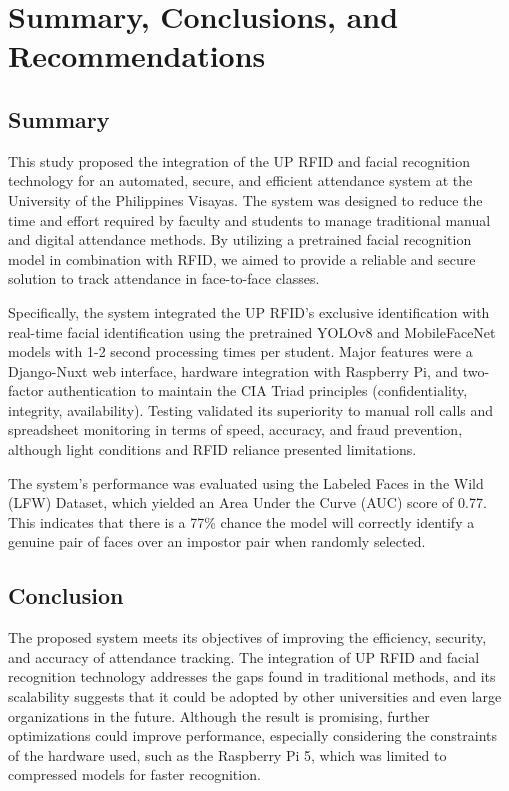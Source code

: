 \chapter{Summary, Conclusions, and Recommendations}

\section{Summary}

	This study proposed the integration of the UP RFID and facial recognition technology for an automated, secure, and efficient attendance system at the University of the Philippines Visayas. The system was designed to reduce the time and effort required by faculty and students to manage traditional manual and digital attendance methods. By utilizing a pretrained facial recognition model in combination with RFID, we aimed to provide a reliable and secure solution to track attendance in face-to-face classes.

	Specifically, the system integrated the UP RFID's exclusive identification with real-time facial identification using the pretrained YOLOv8 and MobileFaceNet models with 1-2 second processing times per student. Major features were a Django-Nuxt web interface, hardware integration with Raspberry Pi, and two-factor authentication to maintain the CIA Triad principles (confidentiality, integrity, availability). Testing validated its superiority to manual roll calls and spreadsheet monitoring in terms of speed, accuracy, and fraud prevention, although light conditions and RFID reliance presented limitations.

	The system's performance was evaluated using the Labeled Faces in the Wild (LFW) Dataset, which yielded an Area Under the Curve (AUC) score of 0.77. This indicates that there is a 77\% chance the model will correctly identify a genuine pair of faces over an impostor pair when randomly selected. 
	
\section{Conclusion}
	
	The proposed system meets its objectives of improving the efficiency, security, and accuracy of attendance tracking. The integration of UP RFID and facial recognition technology addresses the gaps found in traditional methods, and its scalability suggests that it could be adopted by other universities and even large organizations in the future. Although the result is promising, further optimizations could improve performance, especially considering the constraints of the hardware used, such as the Raspberry Pi 5, which was limited to compressed models for faster recognition.
	
